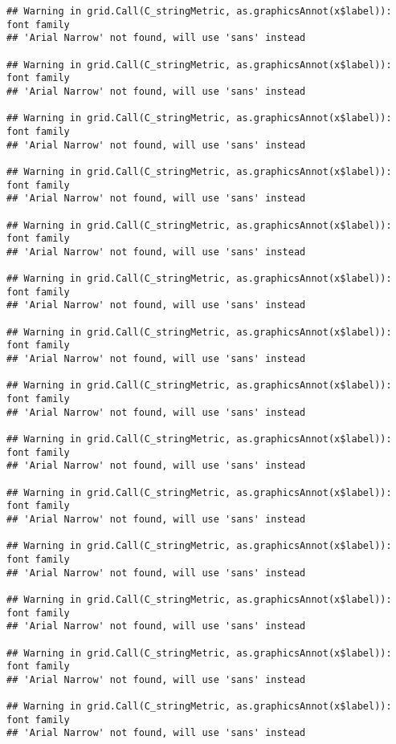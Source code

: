 \documentclass[
]{article}
\begin{document}
\begin{verbatim}
## Warning in grid.Call(C_stringMetric, as.graphicsAnnot(x$label)): font family
## 'Arial Narrow' not found, will use 'sans' instead

## Warning in grid.Call(C_stringMetric, as.graphicsAnnot(x$label)): font family
## 'Arial Narrow' not found, will use 'sans' instead

## Warning in grid.Call(C_stringMetric, as.graphicsAnnot(x$label)): font family
## 'Arial Narrow' not found, will use 'sans' instead

## Warning in grid.Call(C_stringMetric, as.graphicsAnnot(x$label)): font family
## 'Arial Narrow' not found, will use 'sans' instead

## Warning in grid.Call(C_stringMetric, as.graphicsAnnot(x$label)): font family
## 'Arial Narrow' not found, will use 'sans' instead

## Warning in grid.Call(C_stringMetric, as.graphicsAnnot(x$label)): font family
## 'Arial Narrow' not found, will use 'sans' instead

## Warning in grid.Call(C_stringMetric, as.graphicsAnnot(x$label)): font family
## 'Arial Narrow' not found, will use 'sans' instead

## Warning in grid.Call(C_stringMetric, as.graphicsAnnot(x$label)): font family
## 'Arial Narrow' not found, will use 'sans' instead

## Warning in grid.Call(C_stringMetric, as.graphicsAnnot(x$label)): font family
## 'Arial Narrow' not found, will use 'sans' instead

## Warning in grid.Call(C_stringMetric, as.graphicsAnnot(x$label)): font family
## 'Arial Narrow' not found, will use 'sans' instead

## Warning in grid.Call(C_stringMetric, as.graphicsAnnot(x$label)): font family
## 'Arial Narrow' not found, will use 'sans' instead

## Warning in grid.Call(C_stringMetric, as.graphicsAnnot(x$label)): font family
## 'Arial Narrow' not found, will use 'sans' instead

## Warning in grid.Call(C_stringMetric, as.graphicsAnnot(x$label)): font family
## 'Arial Narrow' not found, will use 'sans' instead

## Warning in grid.Call(C_stringMetric, as.graphicsAnnot(x$label)): font family
## 'Arial Narrow' not found, will use 'sans' instead
\end{verbatim}
\end{document}
